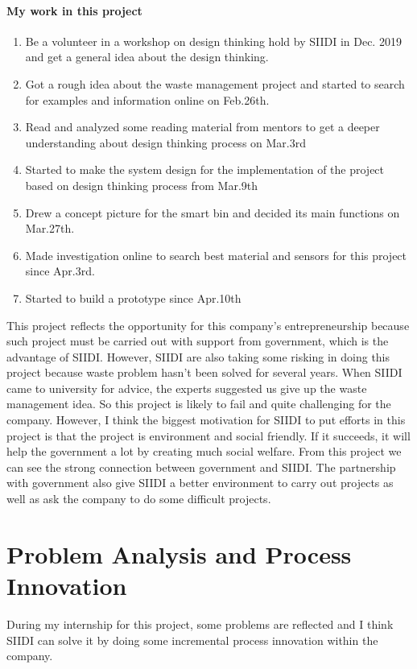 \documentclass[12pt]{article}
\begin{document}
\paragraph{My work in this project}
\begin{enumerate}
\item Be a volunteer in a workshop on design thinking hold by SIIDI in Dec. 2019 and get a general idea about the design thinking.
\item Got a rough idea about the waste management project and started to search for examples and information online on Feb.26th.
\item Read and analyzed some reading material from mentors to get a deeper understanding about design thinking process on Mar.3rd
\item Started to make the system design for the implementation of the project based on design thinking process from Mar.9th
\item Drew a concept picture for the smart bin and decided its main functions on Mar.27th.
\item Made investigation online to search best material and sensors for this project since Apr.3rd.
\item Started to build a prototype since Apr.10th
\end{enumerate}
\par This project reflects the opportunity for this company's entrepreneurship because such project must be carried out with support from government, which is the advantage of SIIDI. However, SIIDI are also taking some risking in doing this project because waste problem hasn't been solved for several years. When SIIDI came to university for advice, the experts suggested us give up the waste management idea. So this project is likely to fail and quite challenging for the company. However, I think the biggest motivation for SIIDI to put efforts in this project is that the project is environment and social friendly. If it succeeds, it will help the government a lot by creating much social welfare. From this project we can see the strong connection between government and SIIDI. The partnership with government also give SIIDI a better environment to carry out projects as well as ask the company to do some difficult projects. 
\section{Problem Analysis and Process Innovation}
During my internship for this project, some problems are reflected and I think SIIDI can solve it by doing some incremental process innovation within the company.
\end{document}
